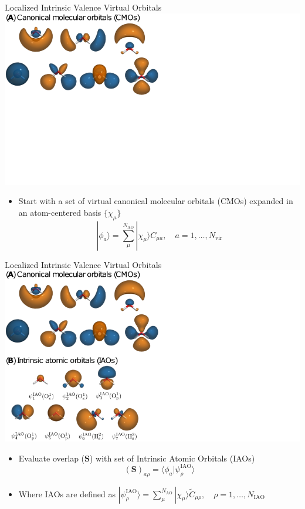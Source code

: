 \documentclass[t]{beamer}
\begin{document}
\begin{frame}{Localized Intrinsic Valence Virtual Orbitals}
\centering
\includegraphics[width=0.75\linewidth]{livvo_procedure_1.png}
\begin{itemize}
\item Start with a set of virtual canonical molecular orbitals (CMOs) expanded in an atom-centered basis $\{\chi_{\mu}\}$
\begin{equation}
|\phi_a\rangle = \sum_{\mu}^{N_\mathrm{AO}} |\chi_{\mu} \rangle C_{\mu a}, \quad a = 1,\ldots,N_\mathrm{vir}
\end{equation}
\end{itemize}
\end{frame}

\begin{frame}{Localized Intrinsic Valence Virtual Orbitals}
\centering
\includegraphics[width=0.75\linewidth]{livvo_procedure_2.png}
\begin{itemize}
\item Evaluate overlap ($\mathbf{S}$) with set of Intrinsic Atomic Orbitals (IAOs) 
\begin{equation}
(\mathbf{S})_{a\rho} = \langle \phi_a | \psi_{\rho}^\mathrm{IAO} \rangle
\end{equation}
\item Where IAOs are defined as {\centering$|\psi_{\rho}^\mathrm{IAO}\rangle = \sum_{\mu}^{N_\mathrm{AO}} |\chi_{\mu} \rangle \tilde{C}_{\mu \rho}, \quad \rho = 1, \ldots, N_\mathrm{IAO}$}
\end{itemize}
\end{frame}
\end{document}
